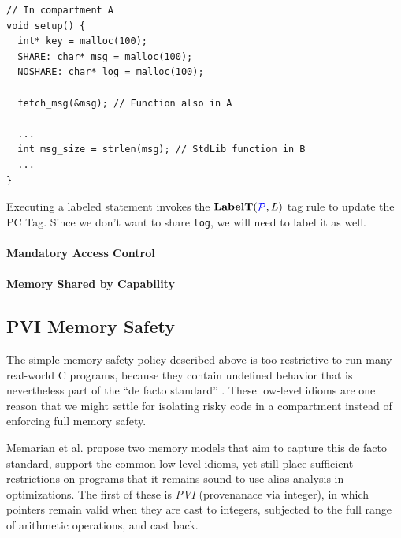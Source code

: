 \documentclass[acmsmall,review,anonymous]{acmart}\settopmatter{printfolios=true,printccs=false,printacmref=false}
\begin{document}
\begin{verbatim}
// In compartment A
void setup() {
  int* key = malloc(100);
  SHARE: char* msg = malloc(100);
  NOSHARE: char* log = malloc(100);

  fetch_msg(&msg); // Function also in A

  ...
  int msg_size = strlen(msg); // StdLib function in B
  ...
}
\end{verbatim}

Executing a labeled statement invokes the \(\mathbf{LabelT}(\mathcal{\color{blue} P}, L)\) tag rule to update the PC Tag.
Since we don't want to share {\tt log}, we will need to label it as well.

\paragraph{Mandatory Access Control}

\paragraph{Memory Shared by Capability}

%
\subsection{PVI Memory Safety}
\label{sec:PVI}

The simple memory safety policy described above is too restrictive to run many real-world
C programs, because they contain undefined behavior that is nevertheless part of the
``de facto standard'' \cite{???}. These low-level idioms are one reason that we might
settle for isolating risky code in a compartment instead of enforcing full memory safety.

Memarian et al. \cite{???} propose two memory models that aim to capture this
de facto standard, support the common low-level idioms, yet still place sufficient
restrictions on programs that it remains sound to use alias analysis in optimizations.
The first of these is {\it PVI} (provenanace via integer), in which pointers remain valid
when they are cast to integers, subjected to the full range of arithmetic operations, and
cast back.
\end{document}
